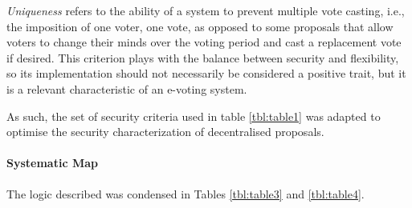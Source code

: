 \documentclass[../access.tex]{subfiles}
\begin{document}
\par
\textit{Uniqueness} refers to the ability of a system to prevent multiple vote casting, i.e., the imposition of one voter, one vote, as opposed to some proposals that allow voters to change their minds over the voting period and cast a replacement vote if desired. This criterion plays with the balance between security and flexibility, so its implementation should not necessarily be considered a positive trait, but it is a relevant characteristic of an e-voting system.
\par
As such, the set of security criteria used in table \ref{tbl:table1} was adapted to optimise the security characterization of decentralised proposals.

\paragraph{Systematic Map}
The logic described was condensed in Tables \ref{tbl:table3} and \ref{tbl:table4}.
\end{document}
